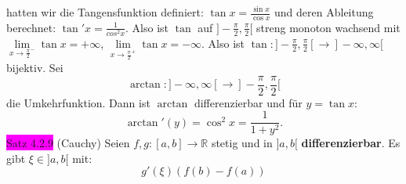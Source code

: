 \documentclass[landscape, 10pt]{article}
\newcommand{\R}{\mathbb{R}}
\begin{document}
\begin{multicols}{3}
                            hatten wir die Tangensfunktion 
                            definiert:
                            \textcolor{NavyBlue}{
                            $\tan x=\frac{\sin x}{\cos x}$} 
                            und deren Ableitung berechnet:
                            \textcolor{NavyBlue}{
                            $\tan'x=\frac{1}{cos^2x}$}. 
                            Also ist 
                            \textcolor{NavyBlue}{$\tan$} auf
                            \textcolor{NavyBlue}{
                            $]-\frac{\pi}{2},\frac{\pi}{2}[$} 
                            streng monoton wachsend mit
                            \textcolor{NavyBlue}{
                            $\lim\limits_{x\to
                            \frac{\pi}{2}^{-}}\tan x=+\infty$},
                            \textcolor{NavyBlue}{
                            $\lim\limits_{x\to
                            \frac{\pi}{2}^{+}}\tan x=-\infty$}.
                            Also ist 
                            \textcolor{NavyBlue}{
                            $\tan:]-\frac{\pi}{2},\frac{\pi}{2}[
                            \longrightarrow]-\infty,\infty[$} 
                            bijektiv. Sei
                            \begin{equation*}
                                   \arctan:]-\infty,\infty[
                                   \longrightarrow
                                   ]-\frac{\pi}{2},\frac{\pi}{2}[
                            \end{equation*}
                            die Umkehrfunktion.
                            Dann ist 
                            \textcolor{NavyBlue}{
                            $\arctan$} differenzierbar und für
                            \textcolor{NavyBlue}{
                            $y=\tan x$}: 
                            \begin{equation*}
                                  \arctan'(y)
                                  =\cos^2x=\frac{1}{1+y^2}.
                            \end{equation*}
              \colorbox{magenta}{Satz 4.2.9} 
              (Cauchy)
                     Seien 
                     \textcolor{NavyBlue}{
                     $f,g:[a,b]\longrightarrow\R$}
                     stetig und in \textcolor{NavyBlue}{$]a,b[$} 
                     \textbf{differenzierbar}. Es gibt 
                     \textcolor{NavyBlue}{$\xi\in]a,b[$} mit:
                     \begin{equation*}
                            g'(\xi)(f(b)-f(a))

\end{equation*}
\end{multicols}
\end{document}
